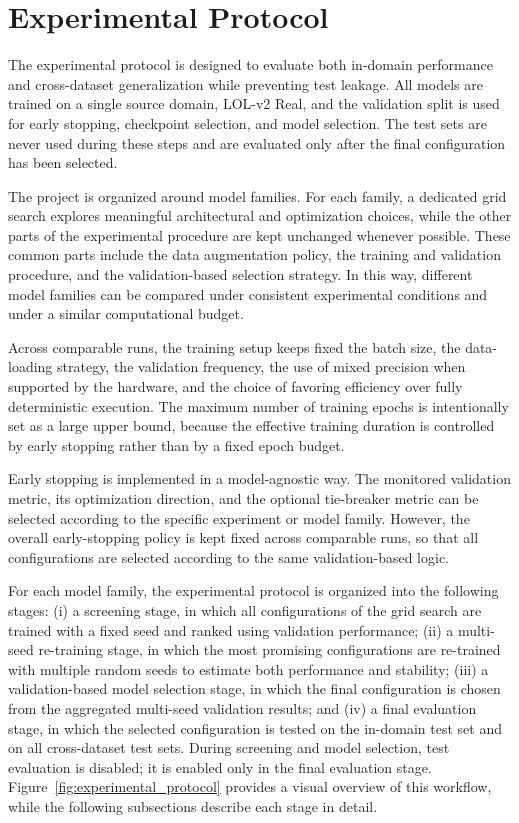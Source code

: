 \section{Experimental Protocol}
\label{sec:experimental_protocol}

The experimental protocol is designed to evaluate both in-domain performance and cross-dataset generalization while preventing test leakage. All models are trained on a single source domain, LOL-v2 Real, and the validation split is used for early stopping, checkpoint selection, and model selection. The test sets are never used during these steps and are evaluated only after the final configuration has been selected.

The project is organized around model families. For each family, a dedicated grid search explores meaningful architectural and optimization choices, while the other parts of the experimental procedure are kept unchanged whenever possible. These common parts include the data augmentation policy, the training and validation procedure, and the validation-based selection strategy. In this way, different model families can be compared under consistent experimental conditions and under a similar computational budget.

Across comparable runs, the training setup keeps fixed the batch size, the data-loading strategy, the validation frequency, the use of mixed precision when supported by the hardware, and the choice of favoring efficiency over fully deterministic execution. The maximum number of training epochs is intentionally set as a large upper bound, because the effective training duration is controlled by early stopping rather than by a fixed epoch budget.

Early stopping is implemented in a model-agnostic way. The monitored validation metric, its optimization direction, and the optional tie-breaker metric can be selected according to the specific experiment or model family. However, the overall early-stopping policy is kept fixed across comparable runs, so that all configurations are selected according to the same validation-based logic.

For each model family, the experimental protocol is organized into the following stages: (i) a screening stage, in which all configurations of the grid search are trained with a fixed seed and ranked using validation performance; (ii) a multi-seed re-training stage, in which the most promising configurations are re-trained with multiple random seeds to estimate both performance and stability; (iii) a validation-based model selection stage, in which the final configuration is chosen from the aggregated multi-seed validation results; and (iv) a final evaluation stage, in which the selected configuration is tested on the in-domain test set and on all cross-dataset test sets. During screening and model selection, test evaluation is disabled; it is enabled only in the final evaluation stage. Figure~\ref{fig:experimental_protocol} provides a visual overview of this workflow, while the following subsections describe each stage in detail.

